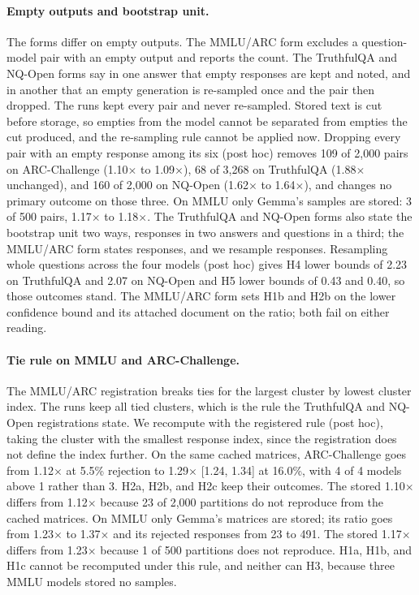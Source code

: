 \paragraph{Empty outputs and bootstrap unit.} The forms differ on empty outputs. The MMLU/ARC form excludes a question-model pair with an empty output and reports the count. The TruthfulQA and NQ-Open forms say in one answer that empty responses are kept and noted, and in another that an empty generation is re-sampled once and the pair then dropped. The runs kept every pair and never re-sampled. Stored text is cut before storage, so empties from the model cannot be separated from empties the cut produced, and the re-sampling rule cannot be applied now. Dropping every pair with an empty response among its six (post hoc) removes 109 of 2,000 pairs on ARC-Challenge (1.10$\times$ to 1.09$\times$), 68 of 3,268 on TruthfulQA (1.88$\times$ unchanged), and 160 of 2,000 on NQ-Open (1.62$\times$ to 1.64$\times$), and changes no primary outcome on those three. On MMLU only Gemma's samples are stored: 3 of 500 pairs, 1.17$\times$ to 1.18$\times$. The TruthfulQA and NQ-Open forms also state the bootstrap unit two ways, responses in two answers and questions in a third; the MMLU/ARC form states responses, and we resample responses. Resampling whole questions across the four models (post hoc) gives H4 lower bounds of 2.23 on TruthfulQA and 2.07 on NQ-Open and H5 lower bounds of 0.43 and 0.40, so those outcomes stand. The MMLU/ARC form sets H1b and H2b on the lower confidence bound and its attached document on the ratio; both fail on either reading.

\paragraph{Tie rule on MMLU and ARC-Challenge.} The MMLU/ARC registration breaks ties for the largest cluster by lowest cluster index. The runs keep all tied clusters, which is the rule the TruthfulQA and NQ-Open registrations state. We recompute with the registered rule (post hoc), taking the cluster with the smallest response index, since the registration does not define the index further. On the same cached matrices, ARC-Challenge goes from 1.12$\times$ at 5.5\% rejection to 1.29$\times$ [1.24, 1.34] at 16.0\%, with 4 of 4 models above 1 rather than 3. H2a, H2b, and H2c keep their outcomes. The stored 1.10$\times$ differs from 1.12$\times$ because 23 of 2,000 partitions do not reproduce from the cached matrices. On MMLU only Gemma's matrices are stored; its ratio goes from 1.23$\times$ to 1.37$\times$ and its rejected responses from 23 to 491. The stored 1.17$\times$ differs from 1.23$\times$ because 1 of 500 partitions does not reproduce. H1a, H1b, and H1c cannot be recomputed under this rule, and neither can H3, because three MMLU models stored no samples.

